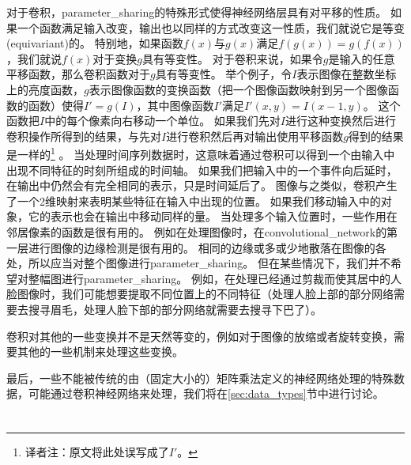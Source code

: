 对于卷积，\gls{parameter_sharing}的特殊形式使得神经网络层具有对平移的性质。
如果一个函数满足输入改变，输出也以同样的方式改变这一性质，我们就说它是等变(equivariant)的。
特别地，如果函数$f(x)$与$g(x)$满足$f(g(x))= g(f(x))$，我们就说$f(x)$对于变换$g$具有等变性。
对于卷积来说，如果令$g$是输入的任意平移函数，那么卷积函数对于$g$具有等变性。
举个例子，令$I$表示图像在整数坐标上的亮度函数，$g$表示图像函数的变换函数（把一个图像函数映射到另一个图像函数的函数）使得$I' = g(I)$，其中图像函数$I'$满足$I'(x,y) = I(x-1, y)$。
这个函数把$I$中的每个像素向右移动一个单位。
如果我们先对$I$进行这种变换然后进行卷积操作所得到的结果，与先对$I$进行卷积然后再对输出使用平移函数$g$得到的结果是一样的\footnote{译者注：原文将此处误写成了$I'$。} 。%
当处理时间序列数据时，这意味着通过卷积可以得到一个由输入中出现不同特征的时刻所组成的时间轴。
如果我们把输入中的一个事件向后延时，在输出中仍然会有完全相同的表示，只是时间延后了。
图像与之类似，卷积产生了一个2维映射来表明某些特征在输入中出现的位置。
如果我们移动输入中的对象，它的表示也会在输出中移动同样的量。
当处理多个输入位置时，一些作用在邻居像素的函数是很有用的。
例如在处理图像时，在\gls{convolutional_network}的第一层进行图像的边缘检测是很有用的。
相同的边缘或多或少地散落在图像的各处，所以应当对整个图像进行\gls{parameter_sharing}。
但在某些情况下，我们并不希望对整幅图进行\gls{parameter_sharing}。
例如，在处理已经通过剪裁而使其居中的人脸图像时，我们可能想要提取不同位置上的不同特征（处理人脸上部的部分网络需要去搜寻眉毛，处理人脸下部的部分网络就需要去搜寻下巴了）。

 
卷积对其他的一些变换并不是天然等变的，例如对于图像的放缩或者旋转变换，需要其他的一些机制来处理这些变换。

最后，一些不能被传统的由（固定大小的）矩阵乘法定义的神经网络处理的特殊数据，可能通过卷积神经网络来处理，我们将在\ref{sec:data_types}节中进行讨论。

\section{}
\label{sec:pooling}

